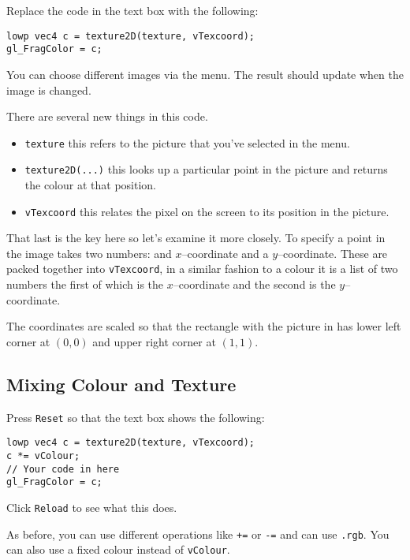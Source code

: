 \documentclass[
  html5,%
  mathml,%
  use filename%
]{internet}
\begin{document}
Replace the code in the text box with the following:

\begin{tcolorbox}
\begin{verbatim}
lowp vec4 c = texture2D(texture, vTexcoord);
gl_FragColor = c;
\end{verbatim}
\end{tcolorbox}

You can choose different images via the menu.
The result should update when the image is changed.

There are several new things in this code.

\begin{itemize}
\item \verb+texture+ this refers to the picture that you've selected in the menu.
\item \verb+texture2D(...)+ this looks up a particular point in the picture and returns the colour at that position.
\item \verb+vTexcoord+ this relates the pixel on the screen to its position in the picture.
\end{itemize}

That last is the key here so let's examine it more closely.
To specify a point in the image takes two numbers: and \(x\)--coordinate and a \(y\)--coordinate.
These are packed together into \verb+vTexcoord+, in a similar fashion to a colour it is a list of two numbers the first of which is the \(x\)--coordinate and the second is the \(y\)--coordinate.

The coordinates are scaled so that the rectangle with the picture in has lower left corner at \((0,0)\) and upper right corner at \((1,1)\).

\subsection{Mixing Colour and Texture}

Press \verb+Reset+ so that the text box shows the following:

\begin{tcolorbox}
\begin{verbatim}
lowp vec4 c = texture2D(texture, vTexcoord);
c *= vColour;
// Your code in here
gl_FragColor = c;
\end{verbatim}
\end{tcolorbox}

Click \verb+Reload+ to see what this does.

As before, you can use different operations like \verb!+=! or \verb!-=! and can use \verb!.rgb!.
You can also use a fixed colour instead of \verb!vColour!.
\end{document}
